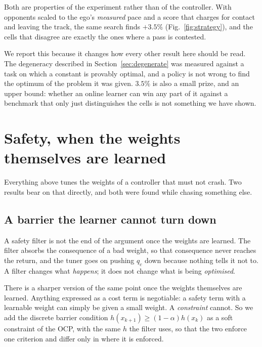 \documentclass[letterpaper, 10 pt, conference]{ieeeconf}
\begin{document}
Both are properties of the experiment rather than of the controller. With
opponents scaled to the ego's \emph{measured} pace and a score that charges for
contact and leaving the track, the same search finds $+3.5\%$
(Fig.~\ref{fig:strategy}), and the cells that disagree are exactly the ones
where a pass is contested.

We report this because it changes how every other result here should be read.
The degeneracy described in Section~\ref{sec:degenerate} was measured against a
task on which a constant is provably optimal, and a policy is not wrong to find
the optimum of the problem it was given. $3.5\%$ is also a small prize, and an
upper bound: whether an online learner can win any part of it against a
benchmark that only just distinguishes the cells is not something we have shown.

\section{Safety, when the weights themselves are learned}\label{sec:safety}

Everything above tunes the weights of a controller that must not crash. Two
results bear on that directly, and both were found while chasing something
else.

\subsection{A barrier the learner cannot turn down}\label{sec:cbf-ocp}
A safety filter is not the end of the argument once the weights are learned.
The filter absorbs the consequence of a bad weight, so that consequence never
reaches the return, and the tuner goes on pushing $q_c$ down because nothing
tells it not to. A filter changes what \emph{happens}; it does not change what
is being \emph{optimised}.

There is a sharper version of the same point once the weights themselves are
learned. Anything expressed as a cost term is negotiable: a safety term with a
learnable weight can simply be given a small weight. A \emph{constraint} cannot.
So we add the discrete barrier condition
$h(x_{k+1}) \ge (1-\alpha)h(x_k)$ as a soft constraint of the OCP, with the same
$h$ the filter uses, so that the two enforce one criterion and differ only in
where it is enforced.
\end{document}
